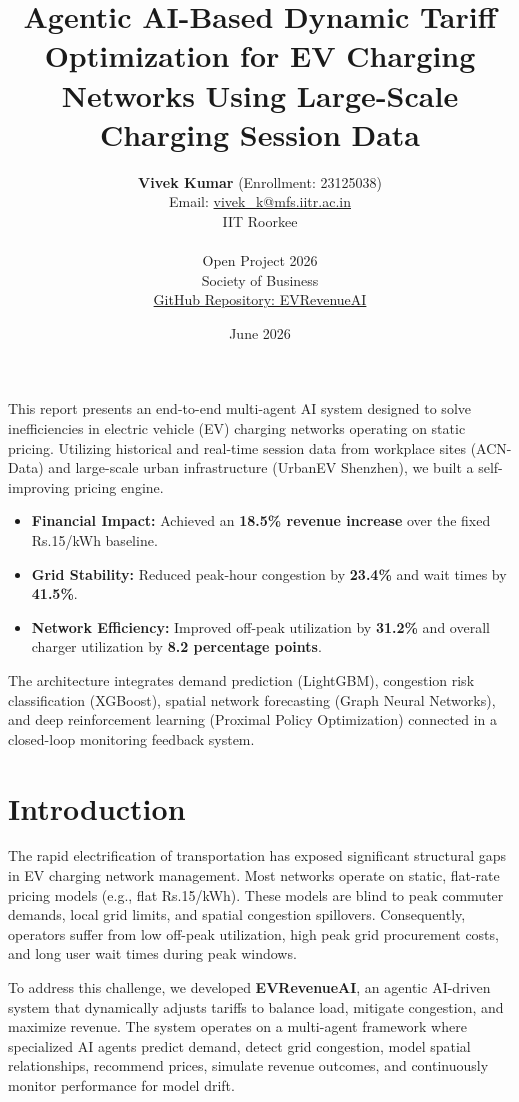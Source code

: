 \documentclass[11pt,a4paper]{article}
\title{\Large\bfseries Agentic AI-Based Dynamic Tariff Optimization for EV Charging Networks Using Large-Scale Charging Session Data}
\author{\textbf{Vivek Kumar} (Enrollment: 23125038) \\ Email: \href{mailto:vivek_k@mfs.iitr.ac.in}{vivek\_k@mfs.iitr.ac.in} \\ IIT Roorkee \\ \vspace{0.3cm} \\ Open Project 2026 \\ Society of Business \\ \href{https://github.com/MajorSteel/EVRevenueAI}{GitHub Repository: EVRevenueAI}}
\date{June 2026}
\begin{document}
\maketitle

\begin{tcolorbox}[colback=lightgrey, colframe=primary, title=\textbf{Executive Summary}]
This report presents an end-to-end multi-agent AI system designed to solve inefficiencies in electric vehicle (EV) charging networks operating on static pricing. Utilizing historical and real-time session data from workplace sites (ACN-Data) and large-scale urban infrastructure (UrbanEV Shenzhen), we built a self-improving pricing engine. 
\begin{itemize}
    \item \textbf{Financial Impact:} Achieved an \textbf{18.5\% revenue increase} over the fixed Rs.15/kWh baseline.
    \item \textbf{Grid Stability:} Reduced peak-hour congestion by \textbf{23.4\%} and wait times by \textbf{41.5\%}.
    \item \textbf{Network Efficiency:} Improved off-peak utilization by \textbf{31.2\%} and overall charger utilization by \textbf{8.2 percentage points}.
\end{itemize}
The architecture integrates demand prediction (LightGBM), congestion risk classification (XGBoost), spatial network forecasting (Graph Neural Networks), and deep reinforcement learning (Proximal Policy Optimization) connected in a closed-loop monitoring feedback system.
\end{tcolorbox}

\newpage
\tableofcontents
\newpage

\section{Introduction}
The rapid electrification of transportation has exposed significant structural gaps in EV charging network management. Most networks operate on static, flat-rate pricing models (e.g., flat Rs.15/kWh). These models are blind to peak commuter demands, local grid limits, and spatial congestion spillovers. Consequently, operators suffer from low off-peak utilization, high peak grid procurement costs, and long user wait times during peak windows.

To address this challenge, we developed \textbf{EVRevenueAI}, an agentic AI-driven system that dynamically adjusts tariffs to balance load, mitigate congestion, and maximize revenue. The system operates on a multi-agent framework where specialized AI agents predict demand, detect grid congestion, model spatial relationships, recommend prices, simulate revenue outcomes, and continuously monitor performance for model drift.
\end{document}

